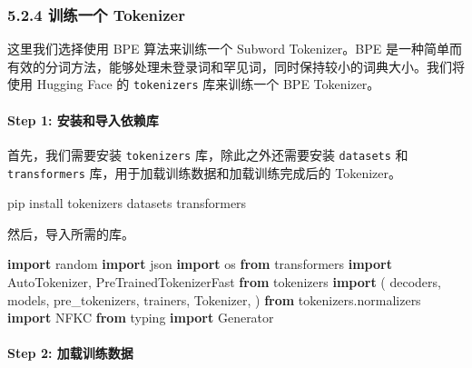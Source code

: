 \documentclass[
]{article}
\newenvironment{Shaded}{}{}
\newcommand{\ExtensionTok}[1]{#1}
\newcommand{\ImportTok}[1]{\textcolor[rgb]{0.00,0.50,0.00}{\textbf{#1}}}
\newcommand{\NormalTok}[1]{#1}
\begin{document}
\subsubsection{5.2.4 训练一个
Tokenizer}\label{ux8badux7ec3ux4e00ux4e2a-tokenizer}

这里我们选择使用 BPE 算法来训练一个 Subword Tokenizer。BPE
是一种简单而有效的分词方法，能够处理未登录词和罕见词，同时保持较小的词典大小。我们将使用
Hugging Face 的 \texttt{tokenizers} 库来训练一个 BPE Tokenizer。

\paragraph{Step 1:
安装和导入依赖库}\label{step-1-ux5b89ux88c5ux548cux5bfcux5165ux4f9dux8d56ux5e93}

首先，我们需要安装 \texttt{tokenizers} 库，除此之外还需要安装
\texttt{datasets} 和 \texttt{transformers}
库，用于加载训练数据和加载训练完成后的 Tokenizer。

\begin{Shaded}
\begin{Highlighting}[]
\ExtensionTok{pip}\NormalTok{ install tokenizers datasets transformers}
\end{Highlighting}
\end{Shaded}

然后，导入所需的库。

\begin{Shaded}
\begin{Highlighting}[]
\ImportTok{import}\NormalTok{ random}
\ImportTok{import}\NormalTok{ json}
\ImportTok{import}\NormalTok{ os}
\ImportTok{from}\NormalTok{ transformers }\ImportTok{import}\NormalTok{ AutoTokenizer, PreTrainedTokenizerFast}
\ImportTok{from}\NormalTok{ tokenizers }\ImportTok{import}\NormalTok{ (}
\NormalTok{    decoders,}
\NormalTok{    models,}
\NormalTok{    pre\_tokenizers,}
\NormalTok{    trainers,}
\NormalTok{    Tokenizer,}
\NormalTok{)}
\ImportTok{from}\NormalTok{ tokenizers.normalizers }\ImportTok{import}\NormalTok{ NFKC}
\ImportTok{from}\NormalTok{ typing }\ImportTok{import}\NormalTok{ Generator}
\end{Highlighting}
\end{Shaded}

\paragraph{Step 2:
加载训练数据}\label{step-2-ux52a0ux8f7dux8badux7ec3ux6570ux636e}
\end{document}

